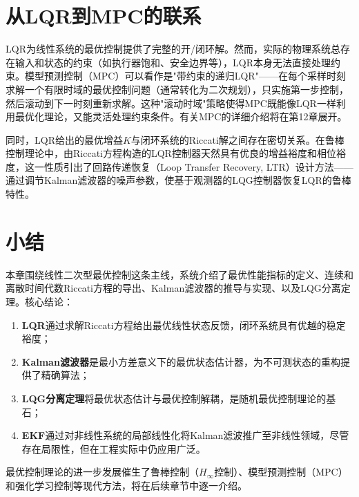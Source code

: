 \section{从LQR到MPC的联系}

LQR为线性系统的最优控制提供了完整的开/闭环解。然而，实际的物理系统总存在输入和状态的约束（如执行器饱和、安全边界等），LQR本身无法直接处理约束。模型预测控制（MPC）可以看作是"带约束的递归LQR"——在每个采样时刻求解一个有限时域的最优控制问题（通常转化为二次规划），只实施第一步控制，然后滚动到下一时刻重新求解。这种"滚动时域"策略使得MPC既能像LQR一样利用最优化理论，又能灵活处理约束条件。有关MPC的详细介绍将在第12章展开。

同时，LQR给出的最优增益$K$与闭环系统的Riccati解之间存在密切关系。在鲁棒控制理论中，由Riccati方程构造的LQR控制器天然具有优良的增益裕度和相位裕度，这一性质引出了回路传递恢复（Loop Transfer Recovery, LTR）设计方法——通过调节Kalman滤波器的噪声参数，使基于观测器的LQG控制器恢复LQR的鲁棒特性。

\section{小结}

本章围绕线性二次型最优控制这条主线，系统介绍了最优性能指标的定义、连续和离散时间代数Riccati方程的导出、Kalman滤波器的推导与实现、以及LQG分离定理。核心结论：
\begin{enumerate}
\item \textbf{LQR}通过求解Riccati方程给出最优线性状态反馈，闭环系统具有优越的稳定裕度；
\item \textbf{Kalman滤波器}是最小方差意义下的最优状态估计器，为不可测状态的重构提供了精确算法；
\item \textbf{LQG分离定理}将最优状态估计与最优控制解耦，是随机最优控制理论的基石；
\item \textbf{EKF}通过对非线性系统的局部线性化将Kalman滤波推广至非线性领域，尽管存在局限性，但在工程实际中仍应用广泛。
\end{enumerate}
最优控制理论的进一步发展催生了鲁棒控制（$H_{\infty}$控制）、模型预测控制（MPC）和强化学习控制等现代方法，将在后续章节中逐一介绍。
